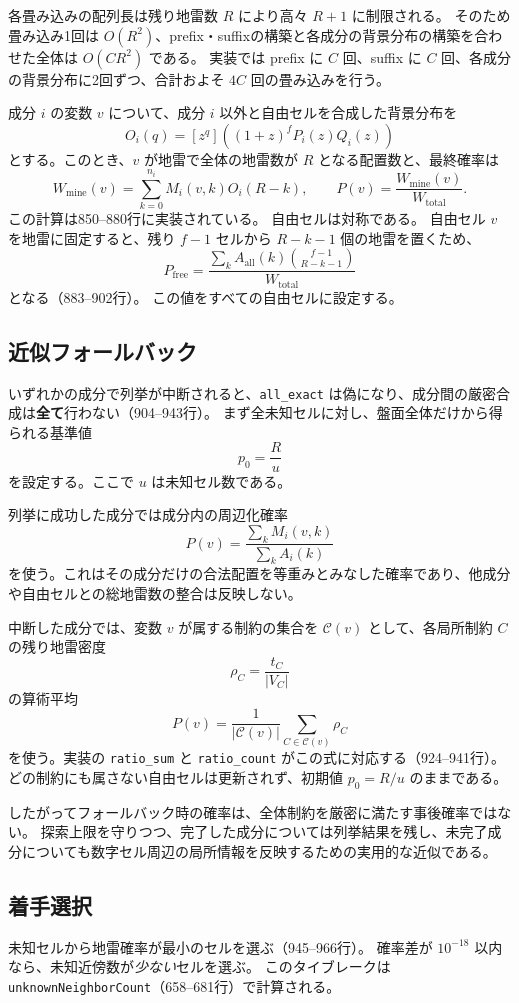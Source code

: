 \documentclass[uplatex,dvipdfmx,11pt]{jsarticle}
\newcommand{\code}[1]{\texttt{#1}}
\begin{document}
各畳み込みの配列長は残り地雷数 $R$ により高々 $R+1$ に制限される。
そのため畳み込み1回は $O(R^2)$、prefix・suffixの構築と各成分の背景分布の構築を合わせた全体は $O(CR^2)$ である。
実装では prefix に $C$ 回、suffix に $C$ 回、各成分の背景分布に2回ずつ、合計およそ $4C$ 回の畳み込みを行う。

成分 $i$ の変数 $v$ について、成分 $i$ 以外と自由セルを合成した背景分布を
\[
  O_i(q)
  =
  [z^q]\left((1+z)^fP_i(z)Q_i(z)\right)
\]
とする。このとき、$v$ が地雷で全体の地雷数が $R$ となる配置数と、最終確率は
\[
  W_{\mathrm{mine}}(v)
  =\sum_{k=0}^{n_i}M_i(v,k)O_i(R-k),\qquad
  P(v)=\frac{W_{\mathrm{mine}}(v)}{W_{\mathrm{total}}}.
\]
この計算は850--880行に実装されている。
自由セルは対称である。
自由セル $v$ を地雷に固定すると、残り $f-1$ セルから $R-k-1$ 個の地雷を置くため、
\[
  P_{\mathrm{free}}
  =
  \frac{
    \sum_k A_{\mathrm{all}}(k)\binom{f-1}{R-k-1}
  }{W_{\mathrm{total}}}
\]
となる（883--902行）。
この値をすべての自由セルに設定する。

\subsection{近似フォールバック}
いずれかの成分で列挙が中断されると、\code{all\_exact} は偽になり、成分間の厳密合成は\textbf{全て}行わない（904--943行）。
まず全未知セルに対し、盤面全体だけから得られる基準値
\[
  p_0=\frac{R}{u}
\]
を設定する。ここで $u$ は未知セル数である。

列挙に成功した成分では成分内の周辺化確率
\[
  P(v)=
  \frac{\sum_kM_i(v,k)}{\sum_kA_i(k)}
\]
を使う。これはその成分だけの合法配置を等重みとみなした確率であり、他成分や自由セルとの総地雷数の整合は反映しない。

中断した成分では、変数 $v$ が属する制約の集合を $\mathcal{C}(v)$ として、各局所制約 $C$ の残り地雷密度
\[
  \rho_C=\frac{t_C}{|V_C|}
\]
の算術平均
\[
  P(v)=
  \frac{1}{|\mathcal{C}(v)|}
  \sum_{C\in\mathcal{C}(v)}\rho_C
\]
を使う。実装の \code{ratio\_sum} と \code{ratio\_count} がこの式に対応する（924--941行）。
どの制約にも属さない自由セルは更新されず、初期値 $p_0=R/u$ のままである。

したがってフォールバック時の確率は、全体制約を厳密に満たす事後確率ではない。
探索上限を守りつつ、完了した成分については列挙結果を残し、未完了成分についても数字セル周辺の局所情報を反映するための実用的な近似である。

\subsection{着手選択}
未知セルから地雷確率が最小のセルを選ぶ（945--966行）。
確率差が $10^{-18}$ 以内なら、未知近傍数が\emph{少ない}セルを選ぶ。
このタイブレークは \code{unknownNeighborCount}（658--681行）で計算される。
\end{document}
